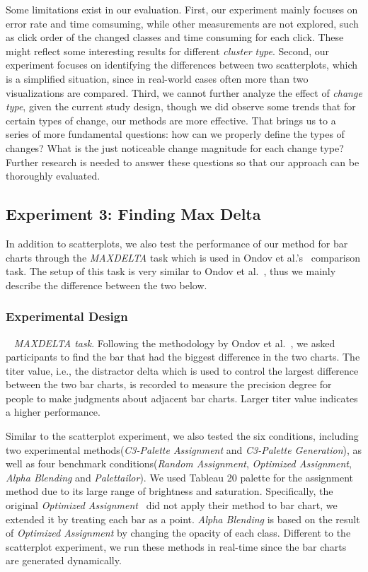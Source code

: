 Some limitations exist in our evaluation.
First, our experiment mainly focuses on error rate and time comsuming, while other measurements are not explored, such as click order of the changed classes and time consuming for each click. These might reflect some interesting results for different \emph{cluster type}.
Second, our experiment focuses on identifying the differences between two scatterplots, which is a simplified situation, since in real-world cases often more than two visualizations are compared.
Third, we cannot further analyze the effect of \emph{change type}, given the current study design, though we did observe some trends that for certain types of change, our methods are more effective.
That brings us to a series of more fundamental questions: how can we properly define the types of changes? What is the just noticeable change magnitude for each change type?
Further research is needed to answer these questions so that our approach can be thoroughly evaluated.

\subsection{Experiment 3: Finding Max Delta}
\label{subsec:onlinestudy3}
In addition to scatterplots, we also test the performance of our method for bar charts through the \emph{MAXDELTA} task which is used in Ondov et al.'s~\cite{Ondov19} comparison task. The setup of this task is very similar to Ondov et al.~\cite{Ondov19}, thus we mainly describe the difference between the two below.
\subsubsection{Experimental Design}
\
\newline
{}
\emph{MAXDELTA task}. Following the methodology by Ondov et al.~\cite{Ondov19}, we asked participants to find the bar that had the biggest difference in the two charts. The titer value, i.e., the distractor delta which is used to control the largest difference between the two bar charts, is recorded to measure the precision degree for people to make judgments about adjacent bar charts. Larger titer value indicates a higher performance.


Similar to the scatterplot experiment, we also tested the six conditions, including two experimental methods(\emph{C3-Palette Assignment} and \emph{C3-Palette Generation}), as well as four benchmark conditions(\emph{Random Assignment}, \emph{Optimized Assignment}, \emph{Alpha Blending} and \emph{Palettailor}). We used Tableau 20 palette for the assignment method due to its large range of brightness and saturation. Specifically, the original \emph{Optimized Assignment}~\cite{Wang2018} did not apply their method to bar chart, we extended it by treating each bar as a point. \emph{Alpha Blending} is based on the result of \emph{Optimized Assignment} by changing the opacity of each class. Different to the scatterplot experiment, we run these methods in real-time since the bar charts are generated dynamically.

